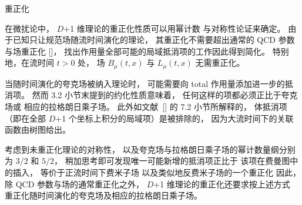  重正化

在微扰论中，
$D$+1 维理论的重正化性质可以用幂计数
与对称性论证来确定。
由于已知只让规范场随流时间演化的理论，
其重正化不需要超出通常的 QCD 参数与场重正化
[\cite{RenFlow}]，
找出作用量全部可能的局域抵消项的工作因此得到简化。
特别地，在流时间 $t>0$ 处，
场 $B_{\mu}(t,x)$ 与 $L_{\mu}(t,x)$ 无需重正化。

当随时间演化的夸克场被纳入理论时，
可能需要向 total 作用量添加进一步的抵消项。
然而 3.2 小节末提到的约化性质意味着，
任何这样的项都必须正比于夸克场或
相应的拉格朗日乘子场。
此外如文献~[\cite{RenFlow}] 的 7.2 小节所解释的，
体抵消项（即在全部 $D$+1 个坐标上积分的局域项）是被排除的，
因为大流时间下的关联函数由树图给出。

考虑到未重正化理论的对称性，
以及夸克场与拉格朗日乘子场的幂计数量纲分别为 $3/2$ 和 $5/2$，
稍加思考即可发现唯一可能新增的抵消项正比于
该项在费曼图中的插入，
等价于正流时间下费米子场
以及类似地反费米子场的一个重正化
因此，除 QCD 参数与场的通常重正化之外，
$D$+1 维理论的重正化还要求按上述方式
重正化随时间演化的夸克场及相应的拉格朗日乘子场。
